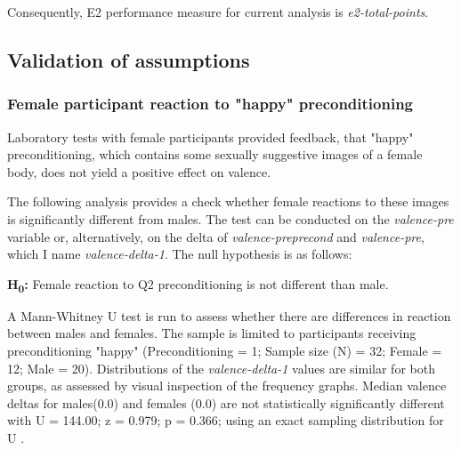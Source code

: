 	Consequently, E2 performance measure for current analysis is \textit{e2-total-points}.
	
	
	
	\subsection{Validation of assumptions} \label{sec:data-validity}
		
		\subsubsection{Female participant reaction to "happy" preconditioning}
		
		
		Laboratory tests with female participants provided feedback, that "happy" preconditioning, which contains some sexually suggestive images of a female body, does not yield a positive effect on valence.
		
		The following analysis provides a check whether female reactions to these images is significantly different from males. The test can be conducted on the \textit{valence-pre} variable or, alternatively, on the delta of \textit{valence-preprecond} and \textit{valence-pre}, which I name \textit{valence-delta-1}. The null hypothesis is as follows:
		 
		\textbf{H\textsubscript{0}:} Female reaction to Q2 preconditioning is not different than male.
		
		A Mann-Whitney U test is run to assess whether there are differences in reaction between males and females. The sample is limited to participants receiving preconditioning "happy" (Preconditioning = 1; Sample size (N) = 32; Female = 12; Male = 20). Distributions of the \textit{valence-delta-1} values are similar for both groups, as assessed by visual inspection of the frequency graphs. Median valence deltas for males(0.0) and females (0.0) are not statistically significantly different with U = 144.00; z = 0.979; p = 0.366; using an exact sampling distribution for U \cite{Dinneen1973}.
		
